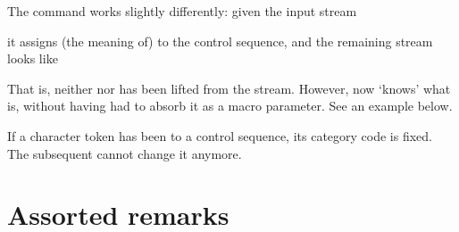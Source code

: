 \documentclass[letterpaper]{book}
\begin{document}
The command  works slightly differently:
given the input stream
\begin{disp}%
       \end{disp}
it assigns (the meaning of)  to the control sequence, 
and the remaining stream looks like
\begin{disp}\end{disp}
That is, neither  nor  has
been lifted from the stream.
However, now 
`knows' what  is, without having had to absorb it
as a macro parameter. See an example below.

If a character token has been  to a control
sequence, its category code is fixed.
The subsequent  cannot change
it anymore.

\section{Assorted remarks}

\end{document}
